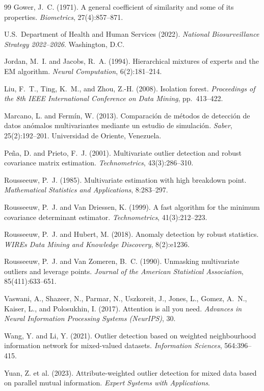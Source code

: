 \documentclass[11pt]{article}
\theoremstyle{plain}
\theoremstyle{definition}
\begin{document}
\begin{thebibliography}{99}
Gower, J.~C. (1971). A general coefficient of
similarity and some of its properties.
\textit{Biometrics}, 27(4):857--871.

U.S.\ Department of Health and Human Services (2022).
\textit{National Biosurveillance Strategy 2022--2026}.
Washington, D.C.

Jordan, M.~I. and Jacobs, R.~A. (1994).
Hierarchical mixtures of experts and the EM algorithm.
\textit{Neural Computation}, 6(2):181--214.

Liu, F.~T., Ting, K.~M., and Zhou, Z.-H. (2008).
Isolation forest. \textit{Proceedings of the 8th IEEE
International Conference on Data Mining}, pp.~413--422.

Marcano, L. and Ferm\'{i}n, W. (2013).
Comparaci\'{o}n de m\'{e}todos de detecci\'{o}n de datos
an\'{o}malos multivariantes mediante un estudio de
simulaci\'{o}n.
\textit{Saber}, 25(2):192--201.
Universidad de Oriente, Venezuela.

Pe\~{n}a, D. and Prieto, F.~J. (2001).
Multivariate outlier detection and robust covariance
matrix estimation.
\textit{Technometrics}, 43(3):286--310.

Rousseeuw, P.~J. (1985). Multivariate estimation with
high breakdown point.
\textit{Mathematical Statistics and Applications},
8:283--297.

Rousseeuw, P.~J. and Van Driessen, K. (1999).
A fast algorithm for the minimum covariance determinant
estimator. \textit{Technometrics}, 41(3):212--223.

Rousseeuw, P.~J. and Hubert, M. (2018).
Anomaly detection by robust statistics.
\textit{WIREs Data Mining and Knowledge Discovery},
8(2):e1236.

Rousseeuw, P.~J. and Van Zomeren, B.~C. (1990).
Unmasking multivariate outliers and leverage points.
\textit{Journal of the American Statistical
Association}, 85(411):633--651.

Vaswani, A., Shazeer, N., Parmar, N., Uszkoreit, J.,
Jones, L., Gomez, A.~N., Kaiser, L., and
Polosukhin, I. (2017). Attention is all you need.
\textit{Advances in Neural Information Processing
Systems (NeurIPS)}, 30.

Wang, Y. and Li, Y. (2021). Outlier detection based
on weighted neighbourhood information network for
mixed-valued datasets.
\textit{Information Sciences}, 564:396--415.

Yuan, Z. et al. (2023). Attribute-weighted outlier
detection for mixed data based on parallel mutual
information. \textit{Expert Systems with Applications}.

\end{thebibliography}
\end{document}
